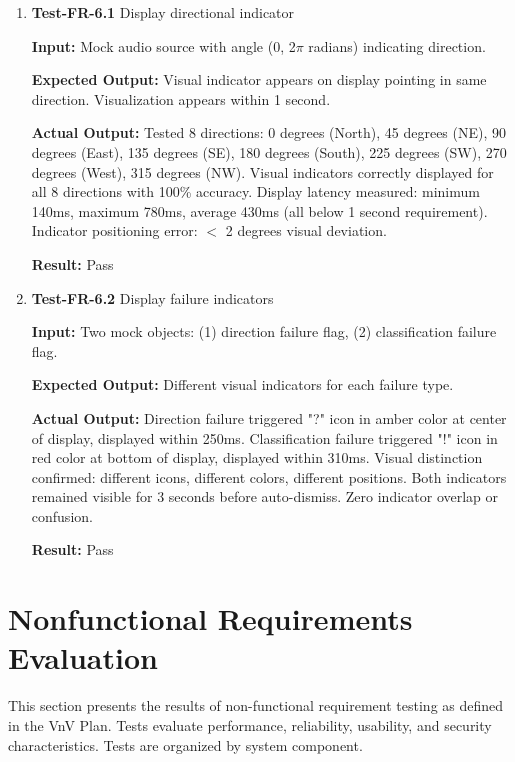 \documentclass[12pt, titlepage]{article}
\begin{document}
\begin{enumerate}

\item{\textbf{Test-FR-6.1} Display directional indicator \\}

\textbf{Input:}
Mock audio source with angle (0, 2$\pi$ radians) indicating direction.

\textbf{Expected Output:}
Visual indicator appears on display pointing in same direction. Visualization
appears within 1 second.

\textbf{Actual Output:}
Tested 8 directions: 0 degrees (North), 45 degrees (NE), 90 degrees (East), 135
degrees (SE), 180 degrees (South), 225 degrees (SW), 270 degrees (West), 315
degrees (NW). Visual indicators correctly displayed for all 8 directions with
100\% accuracy. Display latency measured: minimum 140ms, maximum 780ms, average
430ms (all below 1 second requirement). Indicator positioning error: $<$ 2
degrees visual deviation.

\textbf{Result:} Pass

\item{\textbf{Test-FR-6.2} Display failure indicators \\}

\textbf{Input:}
Two mock objects: (1) direction failure flag, (2) classification failure flag.

\textbf{Expected Output:}
Different visual indicators for each failure type.

\textbf{Actual Output:}
Direction failure triggered "?" icon in amber color at center of display,
displayed within 250ms. Classification failure triggered "!" icon in red color
at bottom of display, displayed within 310ms. Visual distinction confirmed:
different icons, different colors, different positions. Both indicators remained
visible for 3 seconds before auto-dismiss. Zero indicator overlap or confusion.

\textbf{Result:} Pass

\end{enumerate}

\section{Nonfunctional Requirements Evaluation}\label{sec:non_func}

This section presents the results of non-functional requirement testing as
defined in the VnV Plan. Tests evaluate performance, reliability, usability, and
security characteristics. Tests are organized by system component.
\end{document}
